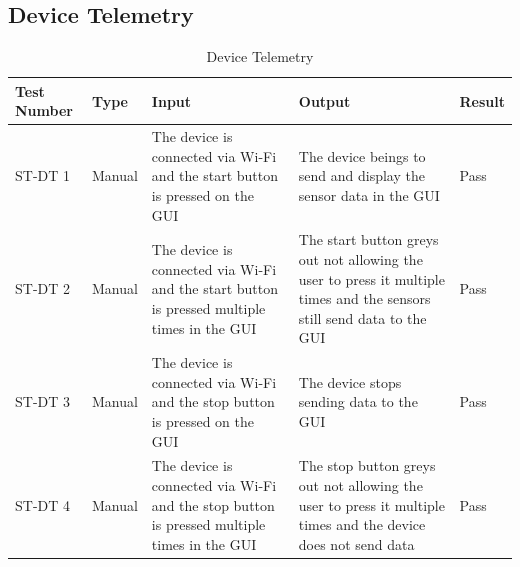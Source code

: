 \documentclass[12pt, titlepage]{article}
\begin{document}
\subsection{Device Telemetry}
\begin{table}[H]
  \begin{tabular}{| p{} | p{}| p{}| p{}| p{}|}
    \hline
    \rowcolor[gray]{0.9}
    Test Number & Type & Input & Output & Result\\
    \hline
    ST-DT 1 & Manual & The device is connected via Wi-Fi and the start button is pressed on the GUI & The device beings to send and display the sensor data in the GUI & Pass \\
    \hline
    ST-DT 2 & Manual & The device is connected via Wi-Fi and the start button is pressed multiple times in the GUI & The start button greys out not allowing the user to press it multiple times and the sensors still send data to the GUI & Pass \\
    \hline
    ST-DT 3 & Manual & The device is connected via Wi-Fi and the stop button is pressed on the GUI & The device stops sending data to the GUI & Pass  \\
    \hline
    ST-DT 4 & Manual & The device is connected via Wi-Fi and the stop button is pressed multiple times in the GUI & The stop button greys out not allowing the user to press it multiple times and the device does not send data & Pass  \\
    \hline
  \end{tabular}
  \caption{Device Telemetry}
  \end{table}

\end{document}
